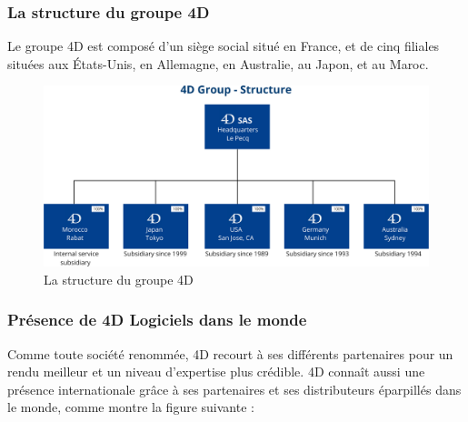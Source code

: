 



\subsubsection{La structure du groupe 4D}
Le groupe 4D est composé d’un siège social situé en France, et de cinq filiales situées
aux États-Unis, en Allemagne, en Australie, au Japon, et au Maroc.

\begin{figure}[h]
    \centering
    \includegraphics[scale=0.35]{Images/groupe.png} %
    \caption{ La structure du groupe 4D}
    \label{fig:groupe}
\end{figure}

\subsubsection{Présence de 4D Logiciels dans le monde}
Comme toute société renommée, 4D recourt à ses différents partenaires pour un rendu
meilleur et un niveau d’expertise plus crédible. 4D connaît aussi une présence 
internationale grâce à ses partenaires et ses distributeurs éparpillés dans le monde, 
comme montre la figure suivante :


